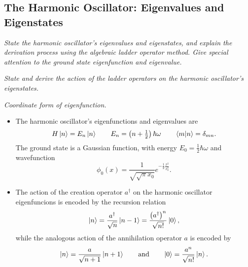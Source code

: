 \documentclass[11pt, a4paper]{article}
\newcommand{\eqtext}[1]{\qquad \text{#1} \qquad}
\begin{document}
\subsection{The Harmonic Oscillator: Eigenvalues and Eigenstates} \label{ss:qho-ladder}
\textit{State the harmonic oscillator's eigenvalues and eigenstates, and explain the derivation process using the algebraic ladder operator method. Give special attention to the ground state eigenfunction and eigenvalue.}

\vspace{2mm}
\textit{State and derive the action of the ladder operators on the harmonic oscillator's eigenstates.}

\vspace{2mm}
\textit{Coordinate form of eigenfunction.}

\begin{itemize}
    \item The harmonic oscillator's eigenfunctions and eigenvalues are
    \begin{equation*}
 		H\ket{n} = E_{n}\ket{n} \qquad E_{n} = \left(n + \tfrac{1}{2}\right)\hbar \omega \qquad \braket{m}{n} = \delta_{mn}.
    \end{equation*}
    The ground state is a Gaussian function, with energy $ E_{0} = \frac{1}{2}\hbar \omega $ and wavefunction
    \begin{equation*}
		\phi_{0}(x) = \frac{1}{\sqrt{\sqrt{\pi}x_{0}}}e^{-\frac{1}{2}\frac{x^{2}}{x_{0}^{2}}}.
    \end{equation*}

    \item The action of the creation operator $ a^{\dagger} $ on the harmonic oscillator eigenfuncions is encoded by the recursion relation
    \begin{equation*}
		\ket{n} = \frac{a^{\dagger}}{\sqrt{n}}\ket{n-1} = \frac{\big(a^{\dagger}\big)^{n}}{\sqrt{n!}}\ket{0},
    \end{equation*}
    while the analogous action of the annihilation operator $ a $ is encoded by
    \begin{equation*}
 		\ket{n} = \frac{a}{\sqrt{n+1}}\ket{n+1} \eqtext{and} \ket{0} = \frac{a^{n}}{\sqrt{n!}}\ket{n}.
    \end{equation*}
    
\end{itemize}
\end{document}
